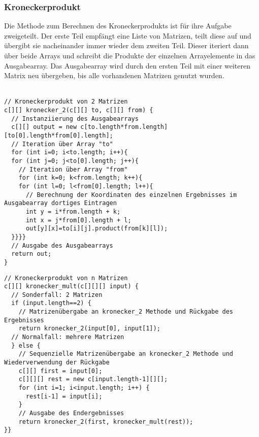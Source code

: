 \documentclass[12pt]{report}
\begin{document}
\newpage



\subsubsection{Kroneckerprodukt}
Die Methode zum Berechnen des Kroneckerprodukts ist für ihre Aufgabe zweigeteilt.
Der erste Teil empfängt eine Liste von Matrizen, teilt diese auf und übergibt sie nacheinander immer wieder dem zweiten Teil. Dieser iteriert dann über beide Arrays und schreibt die Produkte der einzelnen Arrayelemente in das Ausgabearray. Das Ausgabearray wird durch den ersten Teil mit einer weiteren Matrix neu übergeben, bis alle vorhandenen Matrizen genutzt wurden.\\
\vspace{-0.7cm}\\
\lstset{escapechar=@,style=customcsmall}
\noindent\begin{minipage}[t]{.50\textwidth} 
\hspace*{0pt}
\begin{lstlisting} 
// Kroneckerprodukt von 2 Matrizen
c[][] kronecker_2(c[][] to, c[][] from) {
  // Instanziierung des Ausgabearrays
  c[][] output = new c[to.length*from.length] [to[0].length*from[0].length];
  // Iteration über Array "to"
  for (int i=0; i<to.length; i++){
  for (int j=0; j<to[0].length; j++){
    // Iteration über Array "from"
    for (int k=0; k<from.length; k++){    
    for (int l=0; l<from[0].length; l++){
      // Berechnung der Koordinaten des einzelnen Ergebnisses im Ausgabearray dortiges Eintragen
      int y = i*from.length + k;
      int x = j*from[0].length + l;
      out[y][x]=to[i][j].product(from[k][l]);
  }}}}
  // Ausgabe des Ausgabearrays
  return out;
}
\end{lstlisting} 
\end{minipage}
\hfill \hspace{0.2cm}
\begin{minipage}[t]{.49\textwidth} 
\hspace*{0pt}\begin{lstlisting}
// Kroneckerprodukt von n Matrizen
c[][] kronecker_mult(c[][][] input) {
  // Sonderfall: 2 Matrizen
  if (input.length==2) {
    // Matrizenübergabe an kronecker_2 Methode und Rückgabe des Ergebnisses
    return kronecker_2(input[0], input[1]);
  // Normalfall: mehrere Matrizen
  } else {
    // Sequenzielle Matrizenübergabe an kronecker_2 Methode und Wiederverwendung der Rückgabe
    c[][] first = input[0];
    c[][][] rest = new c[input.length-1][][];
    for (int i=1; i<input.length; i++) {
      rest[i-1] = input[i];
    }
    // Ausgabe des Endergebnisses
    return kronecker_2(first, kronecker_mult(rest));
}}
\end{lstlisting} 
\end{minipage}
\end{document}
